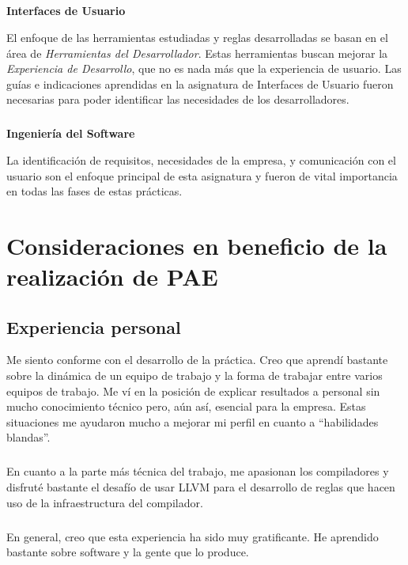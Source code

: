 \documentclass[12pt]{extreport} %
\begin{document}
\paragraph{}
\textbf{Interfaces de Usuario}

El enfoque de las herramientas estudiadas y reglas desarrolladas se
basan en el área de \emph{Herramientas del Desarrollador}. Estas
herramientas buscan mejorar la \emph{Experiencia de Desarrollo}, que
no es nada más que la experiencia de usuario. Las guías e indicaciones
aprendidas en la asignatura de Interfaces de Usuario fueron necesarias
para poder identificar las necesidades de los desarrolladores.

\paragraph{}
\textbf{Ingeniería del Software}

La identificación de requisitos, necesidades de la empresa, y
comunicación con el usuario son el enfoque principal de esta
asignatura y fueron de vital importancia en todas las fases de estas
prácticas.

\chapter{Consideraciones en beneficio de la realización de PAE}

\section{Experiencia personal}

Me siento conforme con el desarrollo de la práctica. Creo que aprendí
bastante sobre la dinámica de un equipo de trabajo y la forma de
trabajar entre varios equipos de trabajo. Me ví en la posición de
explicar resultados a personal sin mucho conocimiento técnico pero,
aún así, esencial para la empresa. Estas situaciones me ayudaron mucho
a mejorar mi perfil en cuanto a ``habilidades blandas''.

\paragraph{}
En cuanto a la parte más técnica del trabajo, me apasionan los
compiladores y disfruté bastante el desafío de usar LLVM para el
desarrollo de reglas que hacen uso de la infraestructura del
compilador.

\paragraph{}
En general, creo que esta experiencia ha sido muy gratificante. He
aprendido bastante sobre software y la gente que lo produce.
\end{document}
